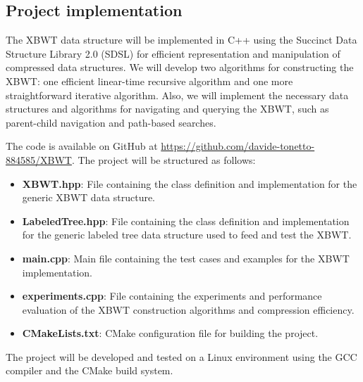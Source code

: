 \subsection{Project implementation}

The XBWT data structure will be implemented in C++ using the Succinct Data Structure Library 2.0 (SDSL) for efficient representation and manipulation of compressed data structures. We will develop two algorithms for constructing the XBWT: one efficient linear-time recursive algorithm and one more straightforward iterative algorithm. Also, we will implement the necessary data structures and algorithms for navigating and querying the XBWT, such as parent-child navigation and path-based searches. 

The code is available on GitHub at \url{https://github.com/davide-tonetto-884585/XBWT}. The project will be structured as follows:

\begin{itemize}
    \item \textbf{XBWT.hpp}: File containing the class definition and implementation for the generic XBWT data structure.
    \item \textbf{LabeledTree.hpp}: File containing the class definition and implementation for the generic labeled tree data structure used to feed and test the XBWT.
    \item \textbf{main.cpp}: Main file containing the test cases and examples for the XBWT implementation.
    \item \textbf{experiments.cpp}: File containing the experiments and performance evaluation of the XBWT construction algorithms and compression efficiency.
    \item \textbf{CMakeLists.txt}: CMake configuration file for building the project.
\end{itemize}

The project will be developed and tested on a Linux environment using the GCC compiler and the CMake build system. 
